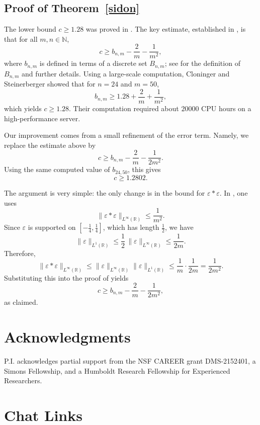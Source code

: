 \documentclass[11pt]{article}
\begin{document}
\subsection{Proof of Theorem~\ref{sidon}}

The lower bound \(c\ge 1.28\) was proved in \cite{CloningerSteinerberger17}. The key estimate, established in \cite[Lemma~3]{CloningerSteinerberger17}, is that for all \(m,n\in\mathbb N\),
\[
c\ge b_{n,m}-\frac{2}{m}-\frac{1}{m^2},
\]
where \(b_{n,m}\) is defined in terms of a discrete set \(B_{n,m}\); see \cite[Lemma~3]{CloningerSteinerberger17} for the definition of $B_{n,m}$ and further details. Using a large-scale computation, Cloninger and Steinerberger \cite[Section 3.3]{CloningerSteinerberger17} showed that for \(n=24\) and \(m=50\),
\[
b_{n,m}\ge 1.28+\frac{2}{m}+\frac{1}{m^2},
\]
which yields \(c\ge 1.28\). Their computation required about \(20000\) CPU hours on a high-performance server.

Our improvement comes from a small refinement of the error term. Namely, we replace the estimate above by
\[
c\ge b_{n,m}-\frac{2}{m}-\frac{1}{2m^2}.
\]
Using the same computed value of \(b_{24,50}\), this gives
\[
c\ge 1.2802.
\]

The argument is very simple: the only change is in the bound for \(\varepsilon\ast\varepsilon\). In \cite[Lemma~3]{CloningerSteinerberger17}, one uses
\[
\|\varepsilon\ast\varepsilon\|_{L^\infty(\mathbb R)}\le \frac{1}{m^2}.
\]
Since \(\varepsilon\) is supported on \(\left[-\tfrac14,\tfrac14\right]\), which has length \(\tfrac12\), we have
\[
\|\varepsilon\|_{L^1(\mathbb R)}
\le \frac12\,\|\varepsilon\|_{L^\infty(\mathbb R)}
\le \frac{1}{2m}.
\]
Therefore,
\[
\|\varepsilon\ast\varepsilon\|_{L^\infty(\mathbb R)}
\le \|\varepsilon\|_{L^\infty(\mathbb R)}\|\varepsilon\|_{L^1(\mathbb R)}
\le \frac1m\cdot\frac{1}{2m}
= \frac{1}{2m^2}.
\]
Substituting this into the proof of \cite[Lemma~3]{CloningerSteinerberger17} yields
\[
c\ge b_{n,m}-\frac{2}{m}-\frac{1}{2m^2},
\]
as claimed.

\section*{Acknowledgments}
 P.I. acknowledges partial support from the NSF CAREER grant DMS-2152401, a Simons Fellowship, and a Humboldt Research Fellowship for Experienced Researchers. 

\appendix
\section{Chat Links}\label{appendix:A}
\end{document}
